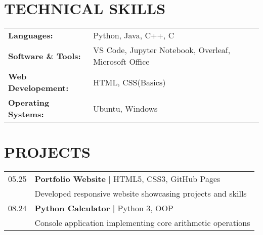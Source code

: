 \documentclass[12pt,a4paper]{moderncv}
\begin{document}
\section{\textbf{TECHNICAL SKILLS}}
\begin{tabular}{@{}ll@{}}
    \textbf{Languages:} & \hspace{0.5em} Python, Java, C++, C \\
     \textbf{Software \& Tools:} & \hspace{0.5em} VS Code, Jupyter Notebook, Overleaf, Microsoft Office \\
    \textbf{Web Developement:} & \hspace{0.5em} HTML, CSS(Basics) \\
    \textbf{Operating Systems:} & \hspace{0.5em} Ubuntu, Windows \\
\end{tabular}




\vspace{0.5cm}






\section{\textbf{PROJECTS}}
\begin{tabular}{r p{}}
  \textsc{05.25} & \hspace{1.5em} \textbf{Portfolio Website} | HTML5, CSS3, GitHub Pages \\
   & \hspace{1.5em} \footnotesize Developed responsive website showcasing projects and skills \\[0.2cm]
  \textsc{08.24} & \hspace{1.5em} \textbf{Python Calculator} | Python 3, OOP \\
   & \hspace{1.5em} \footnotesize Console application implementing core arithmetic operations \\
\end{tabular}


\vspace{0.5cm}
\end{document}
